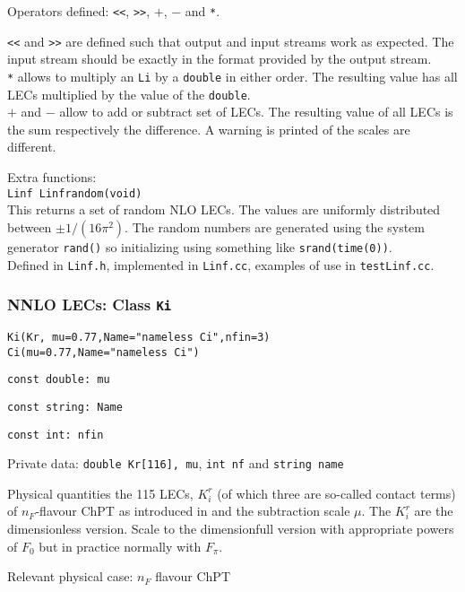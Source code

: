 \documentclass[12pt,a4paper]{article}
\newcommand{\mytt}[1]{\texttt{#1}}
\newcommand{\newfunction}[1]{\mytt{#1}\index{\mytt{#1}}}
\begin{document}
Operators defined: \newfunction{<<}, \newfunction{>>}, \newfunction{$+$}, \newfunction{$-$} and \newfunction{*}.

\mytt{<<} and \mytt{>>} are  defined such that output and input
streams work as expected. The input stream should be exactly in the format
provided by the output stream.\\
\mytt{*} allows to multiply an \mytt{Li} by a \mytt{double} in either order.
The resulting value has all LECs multiplied by the value of the \mytt{double}.\\
\mytt{$+$} and \mytt{$-$} allow to add or subtract set of LECs.
The resulting value of all LECs is the sum respectively the difference.
A warning is printed of the scales are different.

Extra functions:\\
\mytt{Linf \newfunction{Linfrandom}(void)}\\
This returns a set of random NLO LECs.
The values are uniformly distributed between $\pm1/(16\pi^2)$.
The random numbers are generated using the
system generator \mytt{rand()} so initializing using something like
\mytt{srand(time(0))}.\\

Defined in \mytt{Linf.h}, implemented in \mytt{Linf.cc},
examples of use in \mytt{testLinf.cc}.

\subsubsection{NNLO LECs: Class \newfunction{Ki}}

\mytt{Ki(Kr, mu=0.77,Name="nameless Ci",nfin=3)}\\
\mytt{Ci(mu=0.77,Name="nameless Ci")}

\mytt{const double: mu}

\mytt{const string: Name}

\mytt{const int: nfin}

Private data: \mytt{double Kr[116], mu}, \mytt{int nf}
and \mytt{string name}

Physical quantities the 115 LECs, $K_i^r$
(of which three are so-called contact terms)
of $n_F$-flavour ChPT as introduced in \cite{Bijnens:1999sh,Bijnens:1999hw}
and the subtraction
scale $\mu$. The $K_i^r$ are the dimensionless version.
Scale to the dimensionfull version with appropriate powers of $F_0$
but in practice normally with $F_\pi$.

Relevant physical case: $n_F$ flavour ChPT\\
\end{document}
